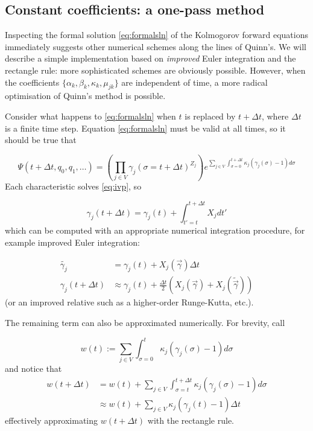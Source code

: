 \documentclass{article}
\begin{document}
\subsection{Constant coefficients: a one-pass method}
\label{sec:flying}

Inspecting the formal solution \eqref{eq:formalsln} of the Kolmogorov forward
equations immediately
suggests other numerical schemes along the lines of Quinn's. We will describe a simple
implementation based on \emph{improved} Euler integration and the rectangle rule: more
sophisticated schemes are obviously possible.
However, when the coefficients $\{\alpha_k, \beta_k, \kappa_k, \mu_{jk}\}$ are
independent of time, a more radical optimisation of Quinn's method is possible.

Consider what happens to \eqref{eq:formalsln} when $t$ is replaced by $t +
\Delta t$, where $\Delta t$ is a finite time step. Equation \eqref{eq:formalsln}
must be valid at all times, so it should be true that

\begin{equation}
    \Psi(t + \Delta t,q_0,q_1,\dots) = \left(\prod_{j \in V}
    \gamma_j(\sigma=t + \Delta t)^{Z_j}\right)
    e^{\sum_{j \in V} \int_{\sigma=0}^{t + \Delta t} \kappa_j (\gamma_j(\sigma)-1) d\sigma}
\end{equation}
Each characteristic solves \eqref{eq:ivp}, so

\begin{equation}
    \gamma_j(t+\Delta t) = \gamma_j(t) + \int_{t'=t}^{t+\Delta t} X_j dt'
\end{equation}
which can be computed with an appropriate numerical integration procedure, for
example improved Euler integration:

\begin{align}
    \tilde{\gamma_j} &= \gamma_j(t) + X_j(\vec{\gamma}) \Delta t \nonumber \\
    \gamma_j(t+\Delta t) &\approx \gamma_j(t) + \frac{\Delta t}{2}
    (X_j(\vec{\gamma}) + X_j(\tilde{\vec{\gamma}}))
\end{align}
(or an improved relative such as a higher-order Runge-Kutta, etc.).

The remaining term can also be approximated numerically. For brevity, call

\begin{equation}
    w(t) := {\sum_{j \in V} \int_{\sigma=0}^{t} \kappa_j (\gamma_j(\sigma)-1) d\sigma}
\end{equation}
and notice that
\begin{align}
    w(t + \Delta t)
    &= w(t) +
    \sum_{j \in V} \int_{\sigma=t}^{t + \Delta t} \kappa_j (\gamma_j(\sigma)-1) d\sigma
    \nonumber \\
    &\approx  w(t) + \sum_{j \in V} \kappa_j (\gamma_j(t)-1) \Delta t
\end{align}
effectively approximating $w(t+\Delta t)$ with the rectangle rule.
\end{document}
